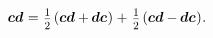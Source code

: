\noindent
{}
%
\begin{equation*}
\bm{c}\bm{d}
\hspace{.1ex} = \hspace{.1ex}
\tikzmark{beginSymmetricPartOfDyad} \smalldisplaystyleonehalf \hspace{-0.1ex} \left( \bm{c}\bm{d} + \hspace{-0.1ex} \bm{d}\bm{c} \hspace{.1ex} \right)  \hspace{-0.3ex} \tikzmark{endSymmetricPartOfDyad}
+ \hspace{.2ex}
\tikzmark{beginSkewsymmetricPartOfDyad} \smalldisplaystyleonehalf \hspace{-0.1ex} \left( \bm{c} \bm{d} - \hspace{-0.1ex} \bm{d} \bm{c} \hspace{.1ex} \right) \hspace{-0.3ex} \tikzmark{endSkewsymmetricPartOfDyad}
.
\end{equation*}%

